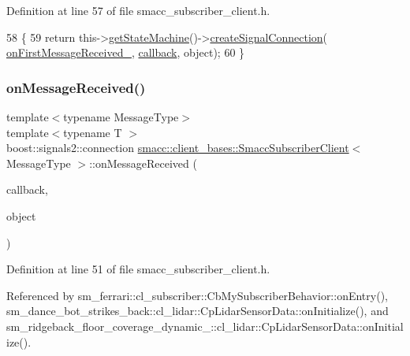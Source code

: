 Definition at line 57 of file smacc\+\_\+subscriber\+\_\+client.\+h.


\begin{DoxyCode}
58   \{
59     \textcolor{keywordflow}{return} this->\hyperlink{classsmacc_1_1ISmaccClient_aec51d4712404cb9882b86e4c854bb93a}{getStateMachine}()->\hyperlink{classsmacc_1_1ISmaccStateMachine_adf0f42ade0c65cc471960fe2a7c42da2}{createSignalConnection}(
      \hyperlink{classsmacc_1_1client__bases_1_1SmaccSubscriberClient_af1ec022065a2df3faabe40768f8b2e22}{onFirstMessageReceived\_}, \hyperlink{sm__ridgeback__barrel__search__1_2servers_2opencv__perception__node_2opencv__perception__node_8cpp_a050e697bd654facce10ea3f6549669b3}{callback}, \textcolor{keywordtype}{object});
60   \}
\end{DoxyCode}
\mbox{\label{classsmacc_1_1client__bases_1_1SmaccSubscriberClient_a4f02251e3a161fb6d802b154b1081f18}} 
\subsubsection{\texorpdfstring{on\+Message\+Received()}{onMessageReceived()}}
{\footnotesize\ttfamily template$<$typename Message\+Type$>$ \\
template$<$typename T $>$ \\
boost\+::signals2\+::connection \hyperlink{classsmacc_1_1client__bases_1_1SmaccSubscriberClient}{smacc\+::client\+\_\+bases\+::\+Smacc\+Subscriber\+Client}$<$ Message\+Type $>$\+::on\+Message\+Received (\begin{DoxyParamCaption}\item[{void(T\+::$\ast$)(const Message\+Type \&)}]{callback,  }\item[{T $\ast$}]{object }\end{DoxyParamCaption})\hspace{0.3cm}{\ttfamily [inline]}}



Definition at line 51 of file smacc\+\_\+subscriber\+\_\+client.\+h.



Referenced by sm\+\_\+ferrari\+::cl\+\_\+subscriber\+::\+Cb\+My\+Subscriber\+Behavior\+::on\+Entry(), sm\+\_\+dance\+\_\+bot\+\_\+strikes\+\_\+back\+::cl\+\_\+lidar\+::\+Cp\+Lidar\+Sensor\+Data\+::on\+Initialize(), and sm\+\_\+ridgeback\+\_\+floor\+\_\+coverage\+\_\+dynamic\+\_\+::cl\+\_\+lidar\+::\+Cp\+Lidar\+Sensor\+Data\+::on\+Initialize().


